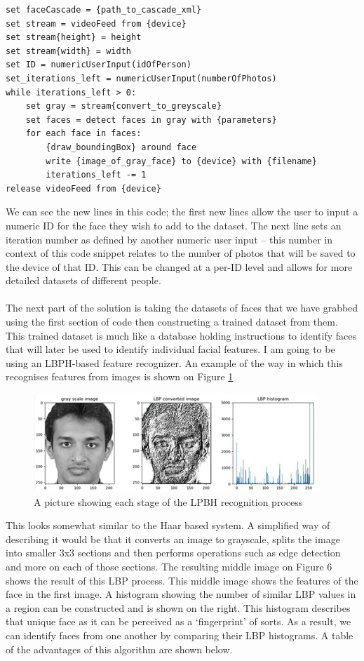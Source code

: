 \documentclass[9pt]{article}
\begin{document}
\begin{lstlisting}
set faceCascade = {path_to_cascade_xml} 
set stream = videoFeed from {device}
set stream{height} = height
set stream{width} = width
set ID = numericUserInput(idOfPerson)
set_iterations_left = numericUserInput(numberOfPhotos)
while iterations_left > 0:
	set gray = stream{convert_to_greyscale}
	set faces = detect faces in gray with {parameters}
	for each face in faces:
		{draw_boundingBox} around face
		write {image_of_gray_face} to {device} with {filename}
		iterations_left -= 1
release videoFeed from {device}
\end{lstlisting}
We can see the new lines in this code; the first new lines allow the user to input a numeric ID for the face they wish to add to the dataset. The next line sets an iteration number as defined by another numeric user input – this number in context of this code snippet relates to the number of photos that will be saved to the device of that ID. This can be changed at a per-ID level and allows for more detailed datasets of different people. \\\\
The next part of the solution is taking the datasets of faces that we have grabbed using the first section of code then constructing a trained dataset from them.  This trained dataset is much like a database holding instructions to identify faces that will later be used to identify individual facial features. I am going to be using an LBPH-based feature recognizer. An example of the way in which this recognises features from images is shown on Figure \ref{fig_LBPH}
\begin{figure}[H]
	\centering
	\includegraphics{lbphRecognition.png}
	\caption{A picture showing each stage of the LPBH recognition process \cite{lbphDiagram}}\label{fig_LBPH}
\end{figure}
This looks somewhat similar to the Haar based system. A simplified way of describing it would be that it converts an image to grayscale, splits the image into smaller 3x3 sections and then performs operations such as edge detection and more on each of those sections. The resulting middle image on Figure 6 shows the result of this LBP process. This middle image shows the features of the face in the first image. A histogram showing the number of similar LBP values in a region can be constructed and is shown on the right. This histogram describes that unique face as it can be perceived as a ‘fingerprint’ of sorts. As a result, we can identify faces from one another by comparing their LBP histograms. A table of the advantages of this algorithm are shown below.
\end{document}
